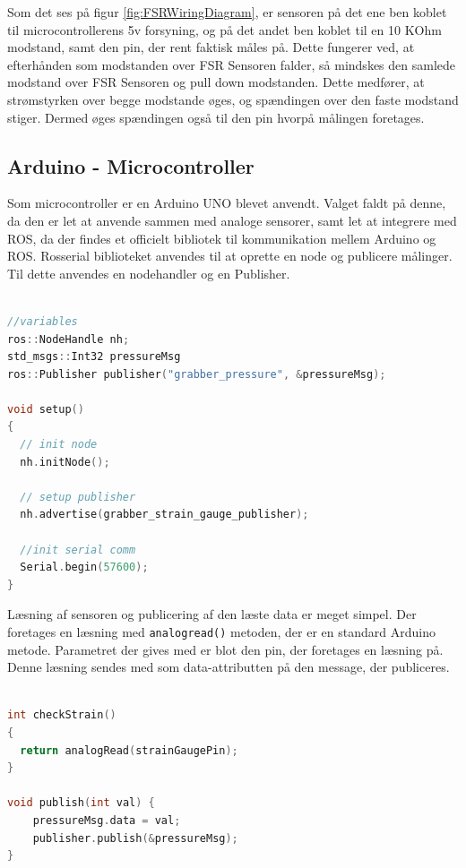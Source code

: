 Som det ses på figur \ref{fig:FSRWiringDiagram}, er sensoren på det ene ben koblet til microcontrollerens 5v forsyning, og på det andet ben koblet til en 10 KOhm modstand, samt den pin, der rent faktisk måles på. Dette fungerer ved, at efterhånden som modstanden over FSR Sensoren falder, så mindskes den samlede modstand over FSR Sensoren og pull down modstanden. Dette medfører, at strømstyrken over begge modstande øges, og spændingen over den faste modstand stiger. Dermed øges spændingen også til den pin hvorpå målingen foretages. 

\subsection{Arduino - Microcontroller}
Som microcontroller er en Arduino UNO blevet anvendt. Valget faldt på denne, da den er let at anvende sammen med analoge sensorer, samt let at integrere med ROS, da der findes et officielt bibliotek til kommunikation mellem Arduino og ROS. 
Rosserial biblioteket anvendes til at oprette en node og publicere målinger. Til dette anvendes en nodehandler og en Publisher. 

\begin{lstlisting}[language=C]

//variables
ros::NodeHandle nh;
std_msgs::Int32 pressureMsg
ros::Publisher publisher("grabber_pressure", &pressureMsg);

void setup()
{
  // init node
  nh.initNode();

  // setup publisher
  nh.advertise(grabber_strain_gauge_publisher);
  
  //init serial comm
  Serial.begin(57600);
}

\end{lstlisting}

Læsning af sensoren og publicering af den læste data er meget simpel. Der foretages en læsning med \texttt{analogread()} metoden, der er en standard Arduino metode. Parametret der gives med er blot den pin, der foretages en læsning på. 
Denne læsning sendes med som data-attributten på den message, der publiceres. 

\begin{lstlisting}[language=C]

int checkStrain()
{
  return analogRead(strainGaugePin);
}

void publish(int val) {
	pressureMsg.data = val;
	publisher.publish(&pressureMsg);
}

\end{lstlisting}

